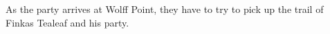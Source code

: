 As the party arrives at Wolff Point, they have to try to pick up the trail of Finkas Tealeaf and his party.
